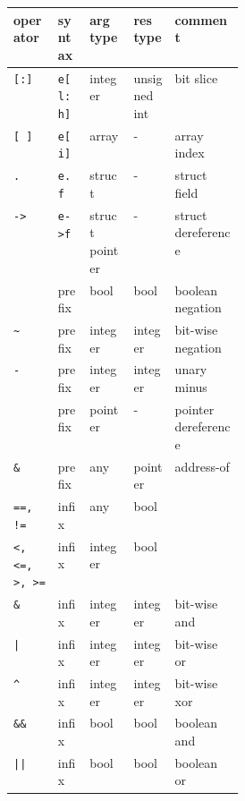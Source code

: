 \begin{table}
\begin{small}
\noindent
\begin{tabular}{|l|l|l|l|p{0.3\linewidth}|}
    \hline
    {\bf operator}                   & {\bf syntax} & {\bf arg type} & {\bf res type} & {\bf comment} \\
    \hline
    \hline 
    {\tt[:]}                         & {\tt e[l:h]} & integer        & unsigned int   & bit slice \\
    {\tt[~]}                         & {\tt e[i]}   & array          & -              & array index \\
    {\tt.}                           & {\tt e.f}    & struct         & -              & struct field \\
    {\tt\verb=->=}                   & {\tt\verb=e->f=}  & struct pointer & -              & struct dereference \\
    \hline
    \src{!}                          & prefix  & bool           & bool           & boolean negation \\
    {\tt\verb=~=}                    & prefix  & integer        & integer        & bit-wise negation \\
    {\tt-}                           & prefix  & integer        & integer        & unary minus \\
    {\tt*}                           & prefix  & pointer        & -              & pointer dereference \\
    {\tt \&}                         & prefix  & any            & pointer        & address-of \\
    \hline
    {\tt ==, !=}                     & infix   & any            & bool           & \\
    {\tt\verb#<, <=, >, >=#}         & infix   & integer        & bool           & \\
    \hline    
    {\tt\&}                          & infix   & integer        & integer        & bit-wise and \\
    \hline    
    {\tt |}                          & infix   & integer        & integer        & bit-wise or \\
    \hline    
    {\tt\verb#^#}                    & infix   & integer        & integer        & bit-wise xor \\
    \hline    
    {\tt\&\&}                        & infix   & bool           & bool           & boolean and \\
    \hline    
    {\tt||}                          & infix   & bool           & bool           & boolean or \\

\end{tabular}
\end{small}
\end{table}
